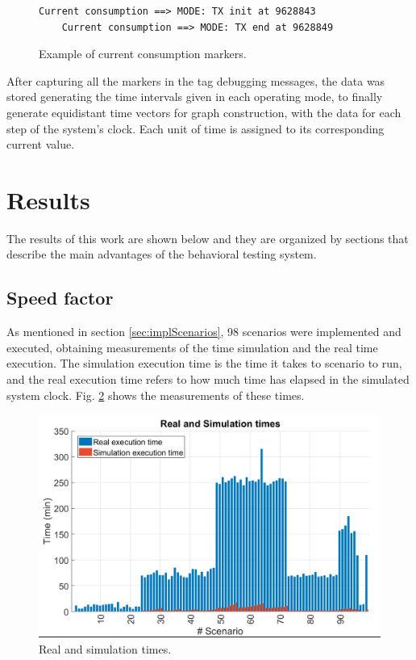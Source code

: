 \documentclass[journal]{IEEEtran}	%
\begin{document}
\begin{figure}[t!]
\centering
\begin{lstlisting}[style=scenarioStyle]
    Current consumption ==> MODE: TX init at 9628843
    Current consumption ==> MODE: TX end at 9628849
\end{lstlisting}
\caption{Example of current consumption markers.}
\label{fig:markers}
\end{figure}

After capturing all the markers in the tag debugging messages, the data was stored generating the time intervals given in each operating mode, to finally generate equidistant time vectors for graph construction, with the data for each step of the system's clock. Each unit of time is assigned to its corresponding current value.


\section{Results}


The results of this work are shown below and they are organized by sections that describe the main advantages of the behavioral testing system.


\subsection{Speed factor}


As mentioned in section \ref{sec:implScenarios}, 98 scenarios were implemented and executed, obtaining measurements of the time simulation and the real time execution. The simulation execution time is the time it takes to scenario to run, and the real execution time refers to how much time has elapsed in the simulated system clock. Fig. \ref{fig:scenarios1} shows the measurements of these times.

\begin{figure}[t!]
\centering
\includegraphics[width=0.95\columnwidth]{scenarios4.png}
\caption{Real and simulation times.}
\label{fig:scenarios1}
\end{figure}
\end{document}
